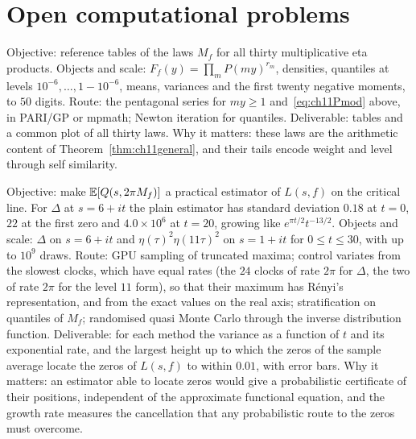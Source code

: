 \section{Open computational problems}

\begin{compproblem}
Objective: reference tables of the laws $M_f$ for all thirty multiplicative eta products. Objects and scale: $F_f(y)=\prod_mP(my)^{r_m}$, densities, quantiles at levels $10^{-6},\ldots,1-10^{-6}$, means, variances and the first twenty negative moments, to $50$ digits. Route: the pentagonal series for $my\ge1$ and~\eqref{eq:ch11Pmod} above, in PARI/GP or mpmath; Newton iteration for quantiles. Deliverable: tables and a common plot of all thirty laws. Why it matters: these laws are the arithmetic content of Theorem~\ref{thm:ch11general}, and their tails encode weight and level through self similarity.
\end{compproblem}

\begin{compproblem}
Objective: make $\mathbb{E}[Q(s,2\pi M_f)]$ a practical estimator of $L(s,f)$ on the critical line. For $\Delta$ at $s=6+it$ the plain estimator has standard deviation $0.18$ at $t=0$, $22$ at the first zero and $4.0\times10^6$ at $t=20$, growing like $e^{\pi t/2}t^{-13/2}$. Objects and scale: $\Delta$ on $s=6+it$ and $\eta(\tau)^2\eta(11\tau)^2$ on $s=1+it$ for $0\le t\le30$, with up to $10^9$ draws. Route: GPU sampling of truncated maxima; control variates from the slowest clocks, which have equal rates (the $24$ clocks of rate $2\pi$ for $\Delta$, the two of rate $2\pi$ for the level $11$ form), so that their maximum has R\'enyi's representation, and from the exact values on the real axis; stratification on quantiles of $M_f$; randomised quasi Monte Carlo through the inverse distribution function. Deliverable: for each method the variance as a function of $t$ and its exponential rate, and the largest height up to which the zeros of the sample average locate the zeros of $L(s,f)$ to within $0.01$, with error bars. Why it matters: an estimator able to locate zeros would give a probabilistic certificate of their positions, independent of the approximate functional equation, and the growth rate measures the cancellation that any probabilistic route to the zeros must overcome.
\end{compproblem}


